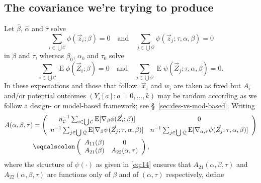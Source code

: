 \documentclass{article}
\newcommand{\eqdef}{\ensuremath{\equalscolon}}
\newcommand{\EE}{\operatorname{E}}
\begin{document}
\subsection{The covariance we're trying to
  produce}\label{sec:covar-were-trying}

Let $\hat\beta$, $\hat\alpha$ and $\hat\tau$ solve
\[\sum_{i\in \bigcup \mathcal{C}}\phi(\vec{z}_{i}; \beta )
  =0\quad\text{and}\quad
\sum_{j\in \bigcup \mathcal{Q}}\psi(\vec{z}_{j}; \tau,
\alpha, \beta )  =0
  \]
  in $\beta$ and $\tau$, whereas $\beta_{0}$, $\alpha_{0}$ and $\tau_{0}$ solve 
\[\sum_{i\in \bigcup \mathcal{C}}\EE\phi(\vec{Z}_{i}; \beta )
  =0\quad\text{and}\quad
\sum_{j\in \bigcup \mathcal{Q}}\EE\psi(\vec{Z}_{j}; \tau,
\alpha, \beta )  =0.
  \]
In these expectations and those that follow, $\vec{x}_{i}$ and $w_{i}$
are taken as fixed but $A_{i}$ and/or potential outcomes $(Y_{i}[a]:
a=0, \ldots, k)$ may be random according as we follow a design- or
model-based framework; see \S~\ref{sec:des-vs-mod-based}.
  Writing
  \begin{align*}
    A(\alpha, \beta, \tau) &= \left(
      \begin{array}{cc}
        n_{\mathcal{C}}^{-1}\sum_{i\in \bigcup
        \mathcal{C}}\EE [\nabla_{\beta}\phi(\vec{Z}_{i};
        \beta )]&0\\
        n^{-1}\sum_{j\in \bigcup
        \mathcal{Q}}\EE[ \nabla_{\beta}\psi(\vec{Z}_{j};
        \tau, \alpha, \beta )]  & n^{-1}\sum_{j\in \bigcup
        \mathcal{Q}}\EE[ \nabla_{\alpha, \tau}\psi(\vec{Z}_{j};
        \tau, \alpha, \beta )]
      \end{array}
    \right)\\
    &\eqdef \left(
      \begin{array}{cc}
        A_{11}(\beta)& 0\\
        A_{21}(\beta) & A_{22}(\alpha, \tau)
      \end{array}
\right),
  \end{align*}
where the structure of $\psi(\cdot)$ as given in \eqref{eq:14} ensures
that $A_{21}(\alpha, \beta, \tau)$ and $A_{22}(\alpha, \beta, \tau)$ are functions only of $\beta$ and of $(\alpha, \tau)$ respectively,
  define 
\end{document}
